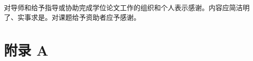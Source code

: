 
\begin{center}
    \xiaoer{}
\end{center}

对导师和给予指导或协助完成学位论文工作的组织和个人表示感谢。内容应简洁明了、实事求是。对课题给予资助者应予感谢。
\clearpage
{}
\section*{附录 A}